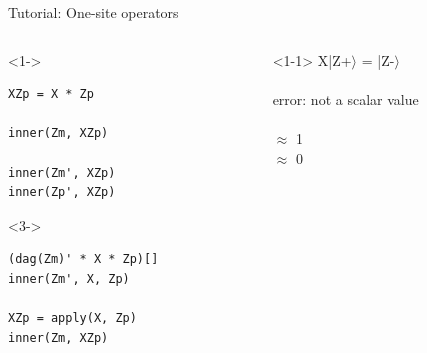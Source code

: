 \begin{frame}[fragile]{Tutorial: One-site operators}

\begin{columns}

\begin{column}{4.5cm}

\begin{onlyenv}<1->
\begin{lstlisting}[language=JuliaLocal, style=julia, basicstyle=\small]
XZp = X * Zp

inner(Zm, XZp)

inner(Zm', XZp)
inner(Zp', XZp)
\end{lstlisting}
\end{onlyenv}

\begin{onlyenv}<3->
\begin{lstlisting}[language=JuliaLocal, style=julia, basicstyle=\small]
(dag(Zm)' * X * Zp)[]
inner(Zm', X, Zp)

XZp = apply(X, Zp)
inner(Zm, XZp)
\end{lstlisting}
\end{onlyenv}

\end{column}

\begin{column}{4.5cm}

\begin{onlyenv}<1-1>
X|Z+$\rangle$ = |Z-$\rangle$ \\
~\\
error: not a scalar value \\
~\\
$\approx$ 1 \\
$\approx$ 0
\end{onlyenv}


\end{column}
\end{columns}
\end{frame}
